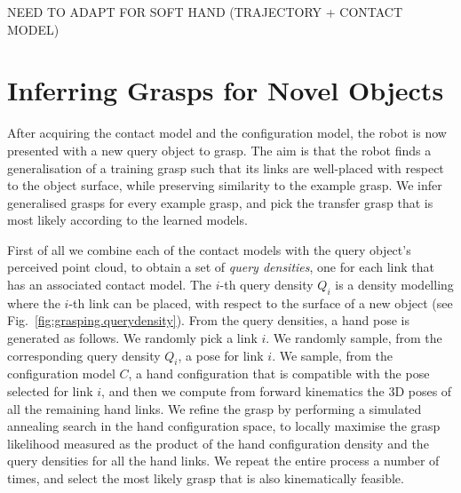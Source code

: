 \documentclass[a4paper, 10pt, conference]{ieeeconf}      %
\newcommand{\fig}{Fig.~}
\newcommand{\rl}{L}
\newcommand{\hc}{C}
\newcommand{\qd}{Q}
\begin{document}
NEED TO ADAPT FOR SOFT HAND (TRAJECTORY + CONTACT MODEL)

\section{Inferring Grasps for Novel Objects}
\label{sec:infer}

After acquiring the contact model and the configuration model, the robot is now presented with a new query object to grasp. The aim is that the robot finds a generalisation of a training grasp such that its links are well-placed with respect to the object surface, while preserving similarity to the example grasp. We infer generalised grasps for every example grasp, and pick the transfer grasp that is most likely according to the learned models.


First of all we combine each of the contact models with the query object's perceived point cloud, to obtain a set of {\em query densities}, one for each link that has an associated contact model. The $i$-th query density $\qd_i$ is a density modelling where the $i$-th link can be placed, with respect to the surface of a new object (see \fig\ref{fig:grasping.querydensity}). From the query densities, a hand pose is generated as follows. We randomly pick a link $i$. We randomly sample, from the corresponding query density $\qd_i$, a pose for link $i$. We sample, from the configuration model $\hc$, a hand configuration that is compatible with the pose selected for link $i$, and then we compute from forward kinematics the 3D poses of all the remaining hand links. We refine the grasp by performing a simulated annealing search in the hand configuration space, to locally maximise the grasp likelihood measured as the product of the hand configuration density and the query densities for all the hand links.
We repeat the entire process a number of times, and select the most likely grasp that is also kinematically feasible.
\end{document}
